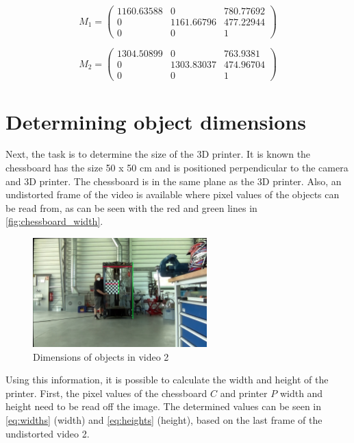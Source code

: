 \begin{equation} \label{eq:matrix1}
    M_1 =
    \begin{pmatrix}
        1160.63588 & 0 & 780.77692\\
        0 & 1161.66796 & 477.22944\\
        0 & 0 & 1
    \end{pmatrix}
\end{equation}


\begin{equation} \label{eq:matrix2}
    M_2 =
    \begin{pmatrix}
        1304.50899 & 0 & 763.9381\\
        0 & 1303.83037 & 474.96704\\
        0 & 0 & 1
    \end{pmatrix}
\end{equation}

\section{Determining object dimensions}

Next, the task is to determine the size of the 3D printer. It is known the chessboard has the size 50 x 50 cm and is positioned perpendicular to the camera and 3D printer. The chessboard is in the same plane as the 3D printer. Also, an undistorted frame of the video is available where pixel values of the objects can be read from, as can be seen with the red and green lines in \autoref{fig:chessboard_width}.

\begin{figure}[h]
    \centering
    \includegraphics[width=0.6\textwidth]{figures/vid2_sizecalc.jpg}
    \caption{Dimensions of objects in video 2}
    \label{fig:chessboard_width}
\end{figure}

Using this information, it is possible to calculate the width and height of the printer. First, the pixel values of the chessboard $C$ and printer $P$ width and height need to be read off the image. The determined values can be seen in \autoref{eq:widths} (width) and \autoref{eq:heights} (height), based on the last frame of the undistorted video 2.

